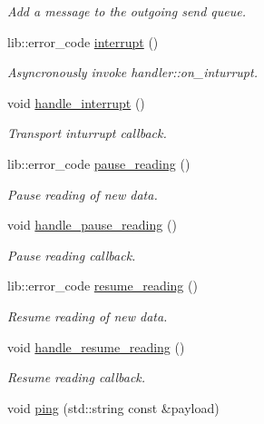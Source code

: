 \begin{DoxyCompactItemize}
\begin{DoxyCompactList}\small\item\em Add a message to the outgoing send queue. \end{DoxyCompactList}\item 
lib\+::error\+\_\+code \hyperlink{classwebsocketpp_1_1connection_a12bbbc93d414c65492ffb2c4a12f05a8}{interrupt} ()
\begin{DoxyCompactList}\small\item\em Asyncronously invoke handler\+::on\+\_\+inturrupt. \end{DoxyCompactList}\item 
void \hyperlink{classwebsocketpp_1_1connection_a0b438ac986b73c99907515eeac6dc45f}{handle\+\_\+interrupt} ()
\begin{DoxyCompactList}\small\item\em Transport inturrupt callback. \end{DoxyCompactList}\item 
lib\+::error\+\_\+code \hyperlink{classwebsocketpp_1_1connection_ad6a4a25a18ec61d2a36a149a3d92ab72}{pause\+\_\+reading} ()
\begin{DoxyCompactList}\small\item\em Pause reading of new data. \end{DoxyCompactList}\item 
void \hyperlink{classwebsocketpp_1_1connection_a5887284ea346efd7b5cc43519bfd84d5}{handle\+\_\+pause\+\_\+reading} ()
\begin{DoxyCompactList}\small\item\em Pause reading callback. \end{DoxyCompactList}\item 
lib\+::error\+\_\+code \hyperlink{classwebsocketpp_1_1connection_a355b5e155ba53071b06fa8a6dfab9be2}{resume\+\_\+reading} ()
\begin{DoxyCompactList}\small\item\em Resume reading of new data. \end{DoxyCompactList}\item 
void \hyperlink{classwebsocketpp_1_1connection_adb5b479b7d66eb289390b26d12332d84}{handle\+\_\+resume\+\_\+reading} ()
\begin{DoxyCompactList}\small\item\em Resume reading callback. \end{DoxyCompactList}\item 
void \hyperlink{classwebsocketpp_1_1connection_a21c8dc6badfaff3aaee1434625c09b04}{ping} (std\+::string const \&payload)

\end{DoxyCompactItemize}
